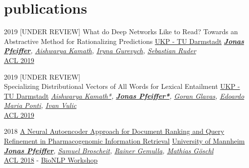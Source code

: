 \documentclass[hidelinks]{cv-style}          %
\begin{document}

\section{publications}
%
\begin{entrylist}

\entry
{2019}
{[UNDER REVIEW] What do Deep Networks Like to Read? Towards an Abstractive Method for Rationalizing Predictions}
{\href{https://www.informatik.tu-darmstadt.de/ukp/ukp_home/index.en.jsp}{UKP - TU Darmstadt}}
{\emph{ \textbf{\href{https://scholar.google.com/citations?user=gGB0L4kAAAAJ}{Jonas Pfeiffer}}, \href{https://ashkamath.github.io/}{Aishwarya Kamath}, \href{https://www.informatik.tu-darmstadt.de/ukp/ukp_home/staff_ukp/prof_dr_iryna_gurevych/index.en.jsp}{Iryna Gurevych},  \href{http://ruder.io/}{Sebastian Ruder}}\\
\href{https://www.aclweb.org}{ACL 2019} \\
}

\entry
{2019}
{[UNDER REVIEW] \\ Specializing Distributional Vectors of All Words for Lexical Entailment}
{\href{https://www.informatik.tu-darmstadt.de/ukp/ukp_home/index.en.jsp}{UKP - TU Darmstadt}}
{\emph{\href{https://ashkamath.github.io/}{Aishwarya Kamath*}, \textbf{\href{https://scholar.google.com/citations?user=gGB0L4kAAAAJ}{Jonas Pfeiffer*}}, \href{https://gogoglavas.wixsite.com/goran}{Goran Glavas}, \href{http://people.ds.cam.ac.uk/ep490/}{Edoardo Maria Ponti}, \href{https://sites.google.com/site/ivanvulic/shortbio}{Ivan Vulic}}\\
\href{https://www.aclweb.org}{ACL 2019} \\
}

\entry
{2018}
{\href{http://www.aclweb.org/anthology/W18-2310}{A Neural Autoencoder Approach for Document Ranking and Query Refinement in Pharmacogenomic Information Retrieval}}
{\href{https://www.wim.uni-mannheim.de/de/fakultaet/}{University of Mannheim}}
{\emph{\textbf{\href{https://scholar.google.com/citations?user=gGB0L4kAAAAJ}{Jonas Pfeiffer}}, \href{https://dblp.org/pers/hd/b/Broscheit:Samuel}{Samuel Broscheit}, \href{https://scholar.google.com/citations?user=s_GmFv0AAAAJ}{Rainer Gemulla}, \href{https://www.xing.com/profile/Mathias_Goeschl?sc_o=da980_e}{Mathias Göschl}}\\
\href{https://www.aclweb.org}{ACL 2018} - \href{https://aclweb.org/aclwiki/BioNLP_Workshop}{BioNLP Workshop} \\

}

\end{entrylist}
\end{document}
